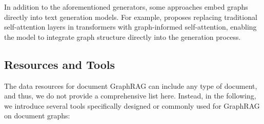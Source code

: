 In addition to the aforementioned generators, some approaches embed graphs directly into text generation models. For example, \citet{li2020leveraging} proposes replacing traditional self-attention layers in transformers with graph-informed self-attention, enabling the model to integrate graph structure directly into the generation process. 








\subsection{Resources and Tools}
The data resources for document GraphRAG can include any type of document, and thus, we do not provide a comprehensive list here. Instead, in the following, we introduce several tools specifically designed or commonly used for GraphRAG on document graphs:



